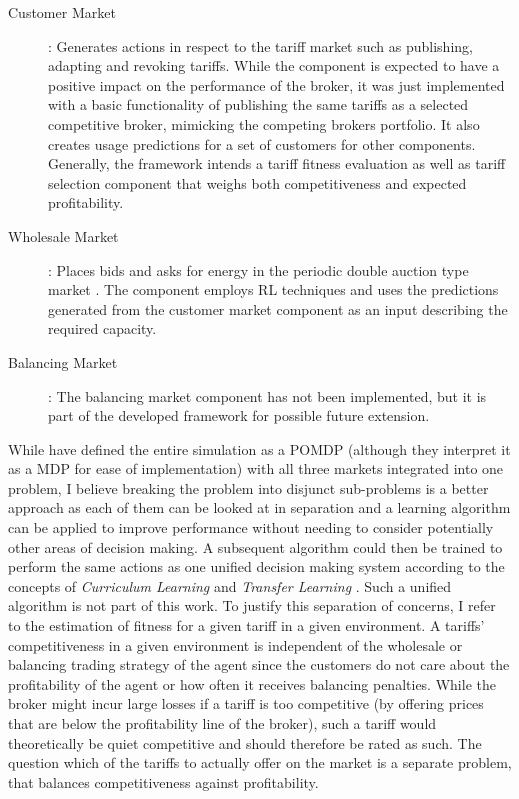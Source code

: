 {\begin{description} 
	\item[Customer Market]: Generates actions in respect to the tariff market such as publishing,
	adapting and revoking tariffs. While the component is expected to have a positive impact on the performance of
	the broker, it was just implemented with a basic functionality of publishing the same tariffs as a selected
	competitive broker, mimicking the competing brokers portfolio. It also creates usage predictions for a set of
	customers for other components. Generally, the framework intends a tariff fitness evaluation as well as tariff
	selection component that weighs both competitiveness and expected profitability.  
	
	\item[Wholesale Market]: Places bids and asks for energy in the periodic double
	auction type market \citep{ketter2018powertac}. The component employs \ac {RL} techniques and uses the
	predictions generated from the customer market component as an input describing the required capacity.

	\item[Balancing Market]: The balancing market component has not been implemented, but it is part of the
	developed framework for possible future extension.  \end{description}

While \citep{tactexurieli2016mdp} have defined the entire simulation as a \ac {POMDP} (although they interpret it as a
\ac {MDP} for ease of implementation) with all three markets integrated into one problem, I believe breaking the problem
into disjunct sub-problems is a better approach as each of them can be looked at in separation and a learning algorithm
can be applied to improve performance without needing to consider potentially other areas of decision making. A
subsequent algorithm could then be trained to perform the same actions as one unified decision making system according
to the concepts of \emph{Curriculum Learning}\citep{matiisen2017teacher} and \emph{Transfer Learning}
\citep{parisotto2015actor}. Such a unified algorithm is not part of this work. 
To justify this separation of concerns, I refer to the estimation of fitness for a given tariff in a given environment. A tariffs' competitiveness in a
given environment is independent of the wholesale or balancing trading strategy of the agent since the customers do not
care about the profitability of the agent or how often it receives balancing penalties. While the broker might incur
large losses if a tariff is too competitive (by offering prices that are below the profitability line of the broker),
such a tariff would theoretically be quiet competitive and should therefore be rated as such. The question which of the
tariffs to actually offer on the market is a separate problem, that balances competitiveness against profitability.

}
